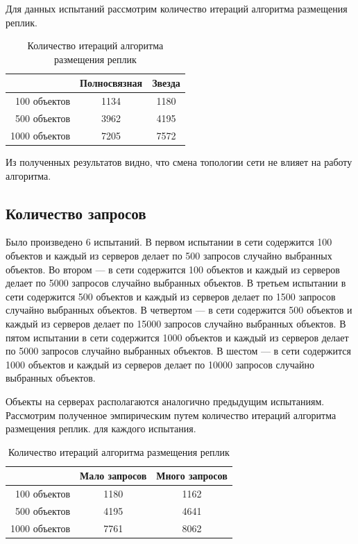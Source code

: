 			Для данных испытаний рассмотрим количество итераций алгоритма размещения реплик.

			\begin{table}[H]
				\small
				\centering
				\caption{Количество итераций алгоритма размещения реплик}
				\begin{tabular} {|r|c|c|}
					\hline
						& Полносвязная 	& Звезда \\
					\hline
	100 объектов		& 1134			& 1180   \\
	500 объектов		& 3962			& 4195   \\
	1000 объектов		& 7205			& 7572   \\
					\hline
				\end{tabular}
			\end{table}

			Из полученных результатов видно, что смена топологии сети не влияет на работу алгоритма.
			
		\subsection{Количество запросов}
			
		
			Было произведено 6 испытаний. В первом испытании в сети содержится 100 объектов и каждый из серверов делает по 500 запросов случайно выбранных объектов. Во втором --- в сети 
			содержится 100 объектов и каждый из серверов делает по 5000 запросов случайно выбранных объектов. В третьем испытании в сети содержится 500 объектов и каждый из серверов делает 
			по 1500 запросов случайно выбранных объектов. В четвертом --- в сети содержится 500 объектов и каждый из серверов делает по 15000 запросов случайно выбранных объектов. В пятом 
			испытании в сети содержится 1000 объектов и каждый из серверов делает по 5000 запросов случайно выбранных объектов. В шестом --- в сети содержится 1000 объектов и каждый из серверов 
			делает по 10000 запросов случайно выбранных объектов.
			
			Объекты на серверах располагаются аналогично предыдущим испытаниям. Рассмотрим полученное эмпирическим путем количество итераций алгоритма размещения реплик. для каждого испытания.

			\begin{table}[H]
				\small
				\centering
				\caption{Количество итераций алгоритма размещения реплик}
				\begin{tabular} {|r|c|c|}
					\hline
						& Мало запросов & Много запросов \\
					\hline
	100 объектов		& 1180			& 1162 \\
	500 объектов		& 4195			& 4641 \\
	1000 объектов		& 7761			& 8062 \\
					\hline
				\end{tabular}
			\end{table}

